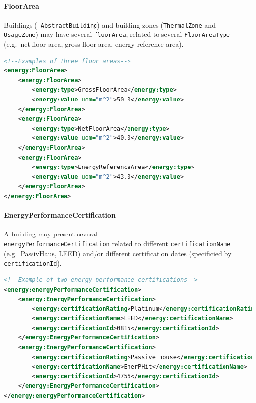 \documentclass[a4paper,12pt]{article}
\begin{document}
\paragraph{FloorArea}\label{floorarea}

Buildings (\lstinline!_AbstractBuilding!) and building zones
(\lstinline!ThermalZone! and \lstinline!UsageZone!) may have several
\lstinline!floorArea!, related to several \lstinline!FloorAreaType!
(e.g.~net floor area, gross floor area, energy reference area).

\begin{lstlisting}[language=XML]
<!--Examples of three floor areas-->
<energy:FloorArea>
    <energy:FloorArea>
        <energy:type>GrossFloorArea</energy:type>
        <energy:value uom="m^2">50.0</energy:value>
    </energy:FloorArea>
    <energy:FloorArea>
        <energy:type>NetFloorArea</energy:type>
        <energy:value uom="m^2">40.0</energy:value>
    </energy:FloorArea>
    <energy:FloorArea>
        <energy:type>EnergyReferenceArea</energy:type>
        <energy:value uom="m^2">43.0</energy:value>
    </energy:FloorArea>
</energy:FloorArea>
\end{lstlisting}

\paragraph{EnergyPerformanceCertification}\label{energyperformancecertification}

A building may present several\\
\lstinline!energyPerformanceCertification! related to different
\lstinline!certificationName! (e.g.~PassivHaus, LEED) and/or different
certification dates (specificied by \lstinline!certificationId!).

\begin{lstlisting}[language=XML]
<!--Example of two energy performance certifications-->
<energy:energyPerformanceCertification>
    <energy:EnergyPerformanceCertification>
        <energy:certificationRating>Platinum</energy:certificationRating>
        <energy:certificationName>LEED</energy:certificationName>
        <energy:certificationId>0815</energy:certificationId>
    </energy:EnergyPerformanceCertification>
    <energy:EnergyPerformanceCertification>
        <energy:certificationRating>Passive house</energy:certificationRating>
        <energy:certificationName>EnerPHit</energy:certificationName>
        <energy:certificationId>4756</energy:certificationId>
    </energy:EnergyPerformanceCertification>
</energy:energyPerformanceCertification>
\end{lstlisting}
\end{document}
